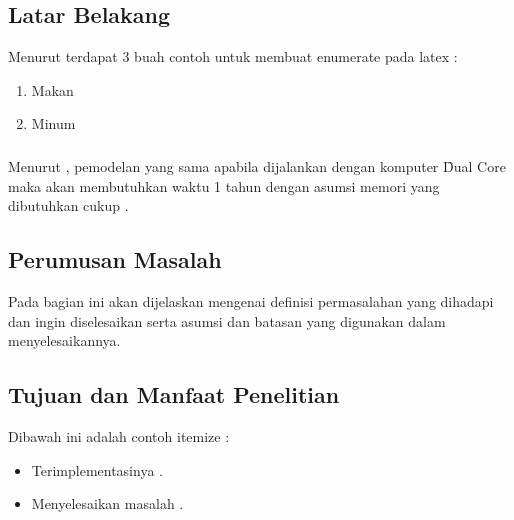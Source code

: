 \chapter{\babSatu}


\section{Latar Belakang}

Menurut \citeauthor{book.buyya} terdapat 3 buah contoh untuk membuat enumerate pada latex \citep{book.buyya}: 
\begin{enumerate}
\item Makan
\item Minum
\end{enumerate}\paragraph{}

Menurut \cite{ppt.ecmwf}, pemodelan yang sama apabila dijalankan dengan komputer \f{Dual Core} maka akan membutuhkan waktu 1 tahun dengan asumsi memori yang dibutuhkan cukup \citep{ppt.ecmwf}.

\section{Perumusan Masalah}
Pada bagian ini akan dijelaskan mengenai definisi permasalahan yang dihadapi dan ingin diselesaikan serta asumsi dan batasan yang digunakan dalam menyelesaikannya.

\section{Tujuan dan Manfaat Penelitian}
Dibawah ini adalah contoh itemize : 
\begin{itemize}
\item Terimplementasinya .
\item Menyelesaikan masalah .
\end{itemize}
